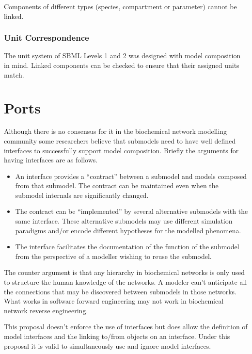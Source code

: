 \documentclass{cekarticle}
\begin{document}
Components of different types (species, compartment or parameter) cannot
be linked.

\subsubsection{Unit Correspondence}
\label{sec:unitcorrespondence}

The unit system of SBML Levels 1 and 2 was designed with model composition in mind.
Linked components can be checked to ensure that their assigned units match. 

\section{Ports}
\label{sec:ports}

Although there is no consensus for it in the biochemical network modelling community some researchers
believe that submodels need to have well defined interfaces to successfully support model composition.
Briefly the arguments for having interfaces are as follows.
\begin{itemize}
\item An interface provides a ``contract'' between a submodel and models composed
from that submodel.  The contract can be 
maintained even when the submodel internals are significantly changed.
\item The contract can be ``implemented'' by several alternative submodels with the same interface.  These
alternative submodels may use different simulation paradigms and/or encode different hypotheses for the modelled
phenomena. 
\item The interface facilitates the documentation of the function of the submodel from the perspective of a modeller
wishing to reuse the submodel.
\end{itemize}

The counter argument is that any hierarchy in biochemical networks is only used to structure the human knowledge
of the networks.  A modeler can't anticipate all the connections that may be discovered between submodels in those
networks.  What works in software forward engineering may not work in biochemical network reverse engineering.

This proposal doesn't enforce the use of interfaces but does allow the definition of model interfaces and
the linking to/from objects on an interface.  Under this proposal it is valid to simultaneously use and ignore model interfaces.
\end{document}
